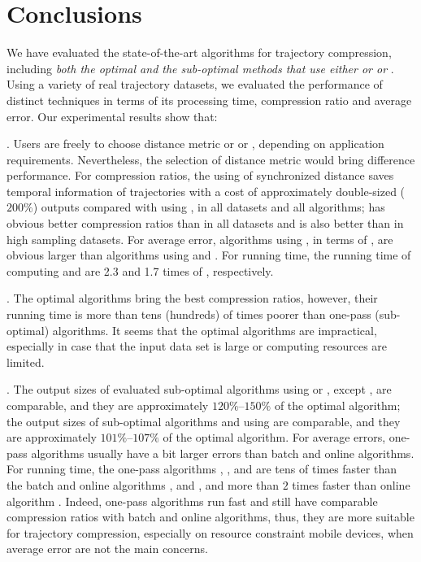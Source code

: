 \vspace{-1ex}
\section{Conclusions}

We have evaluated the state-of-the-art \lsa algorithms for trajectory compression, including \emph{both the optimal and the sub-optimal methods that use either \ped or \sed or \dad}.
Using a variety of real trajectory datasets, we evaluated the performance of distinct techniques in terms of its processing time, compression ratio and average error.
Our experimental results show that:

\emph{}. Users are freely to choose distance metric \sed or \ped or \dad, depending on application requirements. Nevertheless, the selection of distance metric would bring difference performance.
For compression ratios, the using of synchronized distance \sed saves temporal information of trajectories with a cost of approximately double-sized (\ie $200\%$) outputs compared with using \ped, in all datasets and all algorithms; \ped has obvious better compression ratios than \dad in all datasets and \sed is also better than \dad in high sampling datasets.
For average error, algorithms using \dad, in terms of \ped, are obvious larger than algorithms using \ped and \sed.
For running time, the running time of computing \ped and \sed are 2.3 and 1.7 times of \dad, respectively.

\emph{}. The optimal algorithms bring the best compression ratios, however, their running time is more than tens (hundreds) of times poorer than one-pass (sub-optimal) algorithms. It seems that the optimal algorithms are impractical, especially in case that the input data set is large or computing resources are limited.

\emph{}. The output sizes of evaluated sub-optimal algorithms using \ped or \sed, except \squishe, are comparable, and they are approximately $120\%$--$150\%$ of the optimal algorithm; the output sizes of sub-optimal algorithms \tpa and \ridad using \dad are comparable, and they are approximately $101\%$--$107\%$ of the optimal algorithm.
For average errors, one-pass algorithms usually have a bit larger errors than batch and online algorithms.
For running time, the one-pass algorithms \operb, \siped, \cised and \ridad are tens of times faster than the batch and online algorithms \tpa, \dpa and \bqsa, and more than $2$ times faster than online algorithm \squishe. Indeed, one-pass algorithms run fast and still have comparable compression ratios with batch and online algorithms, thus, they are more suitable for trajectory compression, especially on resource constraint mobile devices, when average error are not the main concerns.

